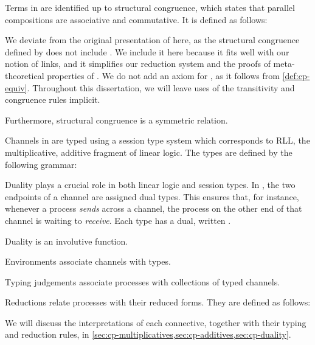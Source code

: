Terms in \rcp are identified up to structural congruence, which states that
parallel compositions  are associative and commutative.
It is defined as follows:

We deviate from the original presentation of \cp here, as the structural
congruence defined by \textcite{wadler2012} does not include \cpEquivLinkComm.
We include it here because it fits well with our notion of links, and it
simplifies our reduction system and the proofs of meta-theoretical properties of
\cp. 
We do not add an axiom for , as it follows from
\cref{def:cp-equiv}.
Throughout this dissertation, we will leave uses of the transitivity and
congruence rules implicit.

Furthermore, structural congruence is a symmetric relation.

%
Channels in \rcp are typed using a session type system which corresponds to RLL,
the multiplicative, additive fragment of linear logic.
The types are defined by the following grammar:

Duality plays a crucial role in both linear logic and session types.
In \rcp, the two endpoints of a channel are assigned dual types.
This ensures that, for instance, whenever a process \emph{sends} across a
channel, the process on the other end of that channel is waiting to
\emph{receive}.
Each type  has a dual, written .

Duality is an involutive function.

%
Environments associate channels with types.

Typing judgements associate processes with collections of typed channels.


Reductions relate processes with their reduced forms.
They are defined as follows:



We will discuss the interpretations of each connective, together with their
typing and reduction rules, in \cref{sec:cp-multiplicatives,sec:cp-additives,sec:cp-duality}.

